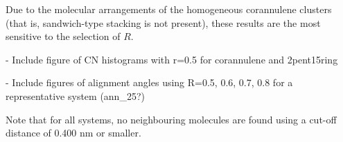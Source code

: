 Due to the molecular arrangements of the homogeneous corannulene clusters (that is, sandwich-type stacking is not present), these results are the most sensitive to the selection of $R$.

- Include figure of CN histograms with r=0.5 for corannulene and 2pent15ring

- Include figures of alignment angles using R=0.5, 0.6, 0.7, 0.8 for a representative system (ann\_25?)

Note that for all systems, no neighbouring molecules are found using a cut-off distance of 0.400 nm or smaller.

\newpage